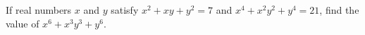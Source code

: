 If real numbers $x$ and $y$ satisfy $x^{2}+xy+y^{2}=7$ and $x^{4}+x^{2}y^{2}+y^{4}=21$, find the value of $x^{6}+x^{3}y^{3}+y^{6}$.
